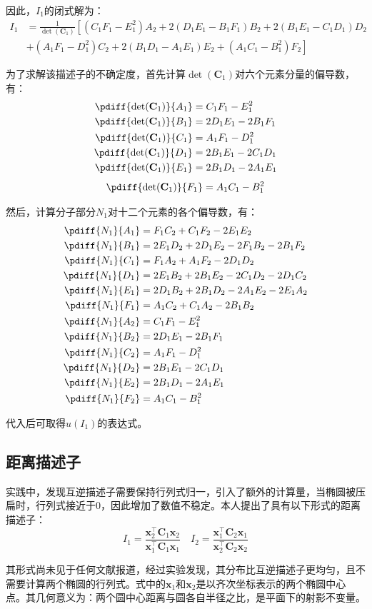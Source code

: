 \documentclass{article}
\begin{document}
因此，$I_1$的闭式解为：
\begin{align*}
  I_1&=\frac{1}{\det(\mathbf{C}_1)}\left[(C_1F_1-E_1^2)A_2+2(D_1E_1-B_1F_1)B_2+2(B_1E_1-C_1D_1)D_2\right.\\
  &\left.+(A_1F_1-D_1^2)C_2+2(B_1D_1-A_1E_1)E_2+(A_1C_1-B_1^2)F_2\right]
\end{align*}\par
为了求解该描述子的不确定度，首先计算$\det(\mathbf{C}_1)$对六个元素分量的偏导数，有：
\begin{align*}
  \pdiff{\det(\mathbf{C}_1)}{A_1}&=C_1F_1-E_1^2\\
  \pdiff{\det(\mathbf{C}_1)}{B_1}&=2D_1E_1-2B_1F_1\\
  \pdiff{\det(\mathbf{C}_1)}{C_1}&=A_1F_1-D_1^2\\
  \pdiff{\det(\mathbf{C}_1)}{D_1}&=2B_1E_1-2C_1D_1\\
  \pdiff{\det(\mathbf{C}_1)}{E_1}&=2B_1D_1-2A_1E_1
\end{align*}
\begin{equation*}
  \pdiff{\det(\mathbf{C}_1)}{F_1}=A_1C_1-B_1^2
\end{equation*}\par
然后，计算分子部分$N_1$对十二个元素的各个偏导数，有：
\begin{align*}
  \pdiff{N_1}{A_1}&=F_1C_2+C_1F_2-2E_1E_2\\
  \pdiff{N_1}{B_1}&=2E_1D_2+2D_1E_2-2F_1B_2-2B_1F_2\\
  \pdiff{N_1}{C_1}&=F_1A_2+A_1F_2-2D_1D_2\\
  \pdiff{N_1}{D_1}&=2E_1B_2+2B_1E_2-2C_1D_2-2D_1C_2\\
  \pdiff{N_1}{E_1}&=2D_1B_2+2B_1D_2-2A_1E_2-2E_1A_2\\
  \pdiff{N_1}{F_1}&=A_1C_2+C_1A_2-2B_1B_2\\
  \pdiff{N_1}{A_2}&=C_1F_1-E_1^2\\
  \pdiff{N_1}{B_2}&=2D_1E_1-2B_1F_1\\
  \pdiff{N_1}{C_2}&=A_1F_1-D_1^2\\
  \pdiff{N_1}{D_2}&=2B_1E_1-2C_1D_1\\
  \pdiff{N_1}{E_2}&=2B_1D_1-2A_1E_1\\
  \pdiff{N_1}{F_2}&=A_1C_1-B_1^2
\end{align*}\par
代入后可取得$u(I_1)$的表达式。
\subsection{距离描述子}
实践中，发现互逆描述子需要保持行列式归一，引入了额外的计算量，当椭圆被压扁时，行列式接近于0，因此增加了数值不稳定。本人提出了具有以下形式的距离描述子：
\begin{equation*}
  I_1 = \frac{\mathbf{x}_2^\top\mathbf{C}_1\mathbf{x}_2}{\mathbf{x}_1^\top\mathbf{C}_1\mathbf{x}_1}\quad I_2 = \frac{\mathbf{x}_1^\top\mathbf{C}_2\mathbf{x}_1}{\mathbf{x}_2^\top\mathbf{C}_2\mathbf{x}_2}
\end{equation*}\par
其形式尚未见于任何文献报道，经过实验发现，其分布比互逆描述子更均匀，且不需要计算两个椭圆的行列式。式中的$\mathbf{x}_1$和$\mathbf{x}_2$是以齐次坐标表示的两个椭圆中心点。其几何意义为：两个圆中心距离与圆各自半径之比，是平面下的射影不变量。
\newpage
\printbibliography[heading=bibliography,title=参考文献]
\end{document}
